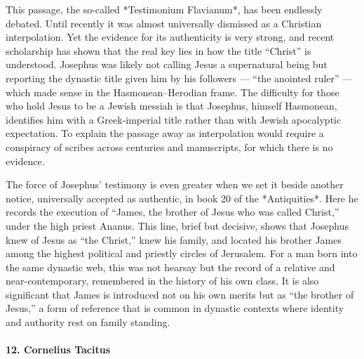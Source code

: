 This passage, the so-called *Testimonium Flavianum*, has been endlessly debated.
Until recently it was almost universally dismissed as a Christian interpolation.
Yet the evidence for its authenticity is very strong, and recent scholarship has shown that the real key lies in how the title “Christ” is understood.
Josephus was likely not calling Jesus a supernatural being but reporting the dynastic title given him by his followers — “the anointed ruler” — which made sense in the Hasmonean–Herodian frame.
The difficulty for those who hold Jesus to be a Jewish messiah is that Josephus, himself Hasmonean, identifies him with a Greek-imperial title rather than with Jewish apocalyptic expectation.
To explain the passage away as interpolation would require a conspiracy of scribes across centuries and manuscripts, for which there is no evidence.

The force of Josephus’ testimony is even greater when we set it beside another notice, universally accepted as authentic, in book 20 of the *Antiquities*.
Here he records the execution of “James, the brother of Jesus who was called Christ,” under the high priest Ananus.
This line, brief but decisive, shows that Josephus knew of Jesus as “the Christ,” knew his family, and located his brother James among the highest political and priestly circles of Jerusalem.
For a man born into the same dynastic web, this was not hearsay but the record of a relative and near-contemporary, remembered in the history of his own class.
It is also significant that James is introduced not on his own merits but as “the brother of Jesus,” a form of reference that is common in dynastic contexts where identity and authority rest on family standing.

\paragraph{12.
Cornelius Tacitus}\label{par:cornelius-tacitus}

